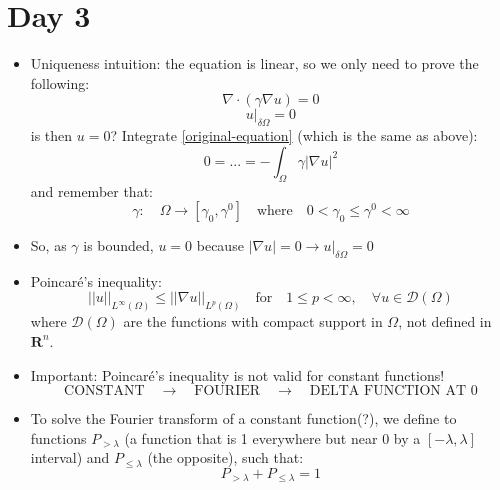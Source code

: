 \documentclass{article}
\begin{document}
\section*{Day 3}
\begin{itemize}
    \item Uniqueness intuition: the equation is linear, so we only need to prove the following:
    \begin{equation}
        \nabla \cdot (\gamma \nabla u) = 0
    \end{equation}
    \begin{equation}
        u|_{\delta \Omega} = 0
    \end{equation}
    is then $u=0$? Integrate \ref{original-equation} (which is the same as above):
    \begin{equation}
        0 = \text{...} = - \int_\Omega \gamma |\nabla u|^2
    \end{equation}
    and remember that:
    \begin{equation}
        \gamma: \quad \Omega \rightarrow [\gamma_0, \gamma^0] \quad \text{where} \quad 0< \gamma_0 \leq \gamma^0 < \infty
    \end{equation}

    \item So, as $\gamma$ is bounded, $u=0$ because $ |\nabla u| = 0 \rightarrow u|_{\delta \Omega} = 0$ 

    \item Poincaré's inequality:
    \begin{equation}
        ||u||_{L^\infty(\Omega)} \leq ||\nabla u||_{L^p(\Omega)} \quad \text{for} \quad 1\leq p < \infty, \quad \forall u \in \mathcal{D}(\Omega)
    \end{equation}
    where $\mathcal{D}(\Omega)$ are the functions with compact support in $\Omega$, not defined in $\mathbf{R}^n$.

    \item Important: Poincaré's inequality is not valid for constant functions!
    \begin{equation}
        \text{CONSTANT} \quad \rightarrow \quad \text{FOURIER}  \quad \rightarrow\quad \text{DELTA FUNCTION AT 0} 
    \end{equation}

    \item To solve the Fourier transform of a constant function(?), we define to functions $P_{>\lambda}$ (a function that is 1 everywhere but near 0 by a $[-\lambda, \lambda]$ interval) and $P_{\leq\lambda}$ (the opposite), such that:
    \begin{equation}
         P_{>\lambda} + P_{\leq\lambda} = 1
    \end{equation}
    

\end{itemize}
\end{document}

